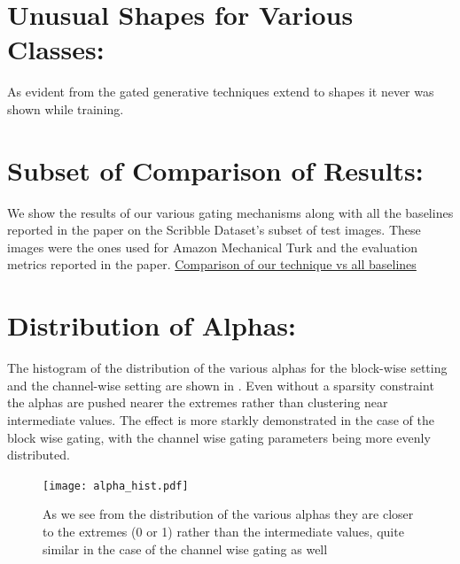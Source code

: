 \section{Unusual Shapes for Various Classes:}


As evident from  
the gated generative techniques extend to shapes it never was shown while training. 

\section{Subset of Comparison of Results:}

We show the results of our various gating mechanisms along with all the baselines reported in the paper on the Scribble Dataset's subset of test images. These images were the ones used for Amazon Mechanical Turk and the evaluation metrics reported in the paper.
\href{http://www.robots.ox.ac.uk/~arnabg/all_results_supplementary/index.html}{Comparison of our technique vs all baselines}

\section{Distribution of Alphas:}
The histogram of the distribution of the various alphas for the block-wise setting and the channel-wise setting are shown in . Even without a sparsity constraint the alphas are pushed nearer the extremes rather than clustering near intermediate values. The effect is more starkly demonstrated in the case of the block wise gating, with the channel wise gating parameters being more evenly distributed.
\begin{figure}[t]
    \centering
    \texttt{[image: alpha\_hist.pdf]}
    \caption{As we see from the distribution of the various alphas they are closer to the extremes (0 or 1) rather than the intermediate values, quite similar in the case of the channel wise gating as well }
    \label{fig:alpha_hist}
    \vspace{-3mm}
\end{figure}

